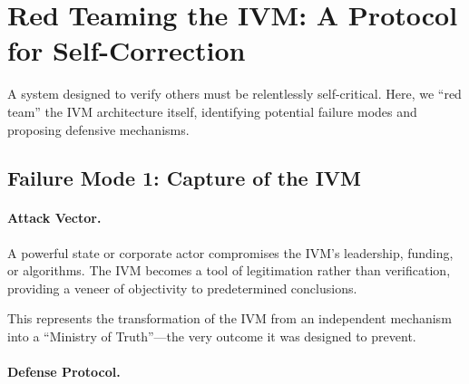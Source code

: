\documentclass[11pt,a4paper]{article}
\begin{document}
\section{Red Teaming the IVM: A Protocol for Self-Correction}

A system designed to verify others must be relentlessly self-critical. Here, we ``red team'' the IVM architecture itself, identifying potential failure modes and proposing defensive mechanisms.

\subsection{Failure Mode 1: Capture of the IVM}

\paragraph{Attack Vector.} A powerful state or corporate actor compromises the IVM's leadership, funding, or algorithms. The IVM becomes a tool of legitimation rather than verification, providing a veneer of objectivity to predetermined conclusions.

This represents the transformation of the IVM from an independent mechanism into a ``Ministry of Truth''---the very outcome it was designed to prevent.

\paragraph{Defense Protocol.}
\end{document}
